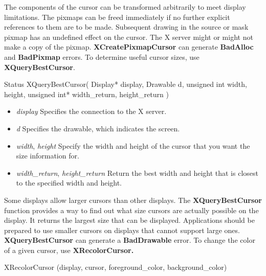 \documentclass{report}
\begin{document}
\begin{itemize}
            \bigbreak \noindent 
            The components of the cursor can be transformed arbitrarily to meet display limitations. The pixmaps can be freed immediately if no further explicit references to them are to be made. Subsequent drawing in the source or mask pixmap has an undefined effect on the cursor. The X server might or might not make a copy of the pixmap.
            \bigbreak \noindent 
            \textbf{XCreatePixmapCursor} can generate \textbf{BadAlloc} and \textbf{BadPixmap} errors.
            \bigbreak \noindent 
            To determine useful cursor sizes, use \textbf{XQueryBestCursor}.
            \begin{cppcode}
                Status XQueryBestCursor(
                    Display* display,
                    Drawable d,
                    unsigned int width, height,
                    unsigned int* width_return, height_return
                )
            \end{cppcode}
            \begin{itemize}
                \item \textit{display} Specifies the connection to the X server.
                \item \textit{d} Specifies the drawable, which indicates the screen.
                \item \textit{width}, \textit{height} Specify the width and height of the cursor that you want the size information for.
                \item \textit{width\_return}, \textit{height\_return} Return the best width and height that is closest to the specified width and height.
            \end{itemize}
            Some displays allow larger cursors than other displays. The \textbf{XQueryBestCursor} function provides a way to find out what size cursors are actually possible on the display. It returns the largest size that can be displayed. Applications should be prepared to use smaller cursors on displays that cannot support large ones.
            \bigbreak \noindent 
            \textbf{XQueryBestCursor} can generate a \textbf{BadDrawable} error.
            \bigbreak \noindent 
            To change the color of a given cursor, use \textbf{XRecolorCursor.}
            \bigbreak \noindent 
            \begin{cppcode}
                XRecolorCursor (display, cursor, foreground_color, background_color)
            \end{cppcode}
            \begin{itemize}

\end{itemize}
\end{itemize}
\end{document}
